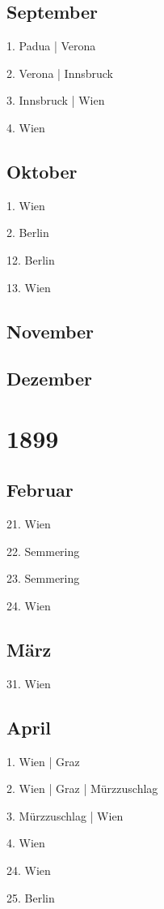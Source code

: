 \documentclass[twoside=false,titlepage=false,open=any, parskip=never, fontsize=10pt, headings=small, chapterprefix=false, appendixprefix=false, DIV=15]{scrbook}
\begin{document}
\begin{multicols}{3}
            \section*{September}
            1. Padua | Verona\par
            2. Verona | Innsbruck\par
            3. Innsbruck | Wien\par
            4. Wien\par
            \section*{Oktober}
            1. Wien\par
            2. Berlin\par
            12. Berlin\par
            13. Wien\par
            \section*{November}
            \section*{Dezember}
            \chapter*{1899}
            \section*{Februar}
            21. Wien\par
            22. Semmering\par
            23. Semmering\par
            24. Wien\par
            \section*{März}
            31. Wien\par
            \section*{April}
            1. Wien | Graz\par
            2. Wien | Graz | Mürzzuschlag\par
            3. Mürzzuschlag | Wien\par
            4. Wien\par
            24. Wien\par
            25. Berlin\par

\end{multicols}
\end{document}

